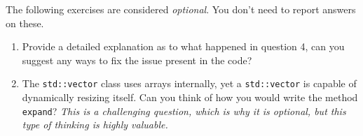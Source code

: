 \documentclass[11pt]{article}
\begin{document}
The following exercises are considered {\it optional}.  You don't need to report answers on these.

\begin{enumerate}[leftmargin=*]

\item Provide a detailed explanation as to what happened in question 4, can you suggest any ways to fix the issue present in the code?

\item The \verb|std::vector| class uses arrays internally, yet a \verb|std::vector| is capable of dynamically resizing itself. Can you think of how you would write the method \verb|expand|? \textit{This is a challenging question, which is why it is optional, but this type of thinking is highly valuable.}

\end{enumerate}

\label{r:lastpage}
\end{document}
